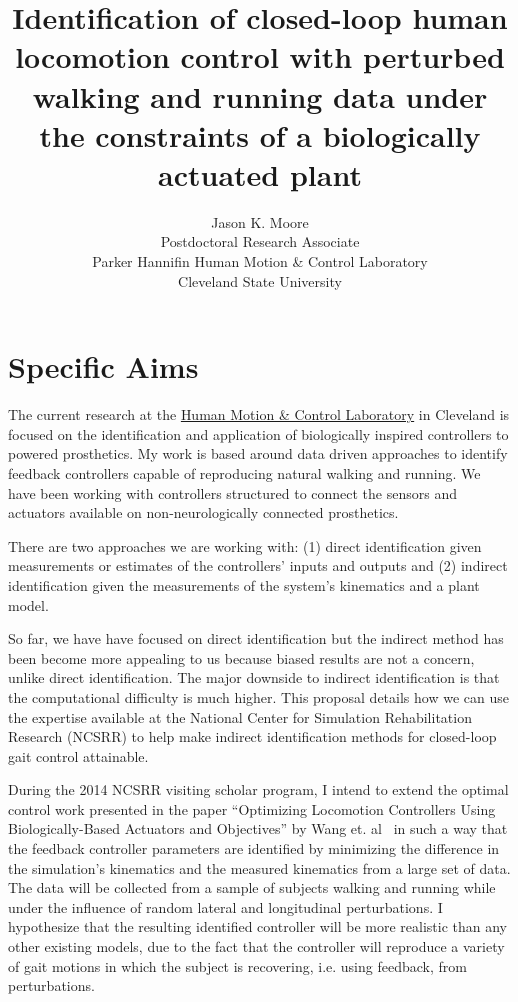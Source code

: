 \documentclass[11pt]{article}
\title{Identification of closed-loop human locomotion control with perturbed
walking and running data under the constraints of a biologically actuated
plant}
\author{Jason K. Moore\\
  Postdoctoral Research Associate\\
  Parker Hannifin Human Motion \& Control Laboratory\\
  Cleveland State University
}
\begin{document}
\maketitle

\section*{Specific Aims}

The current research at the \href{http://hmc.csuohio.edu}{Human Motion \&
Control Laboratory} in Cleveland is focused on the identification and
application of biologically inspired controllers to powered prosthetics. My
work is based around data driven approaches to identify feedback controllers
capable of reproducing natural walking and running. We have been working with
controllers structured to connect the sensors and actuators available on
non-neurologically connected prosthetics.

There are two approaches we are working with: (1) direct identification given
measurements or estimates of the controllers' inputs and outputs and (2)
indirect identification given the measurements of the system's kinematics and a
plant model.

So far, we have have focused on direct identification but the indirect method
has been become more appealing to us because biased results are not a concern,
unlike direct identification. The major downside to indirect identification is
that the computational difficulty is much higher. This proposal details how we
can use the expertise available at the National Center for Simulation
Rehabilitation Research (NCSRR) to help make indirect identification methods
for closed-loop gait control attainable.

During the 2014 NCSRR visiting scholar program, I intend to extend the optimal
control work presented in the paper ``Optimizing Locomotion Controllers Using
Biologically-Based Actuators and Objectives'' by Wang et. al~\cite{Wang2012} in
such a way that the feedback controller parameters are identified by minimizing the
difference in the simulation's kinematics and the measured kinematics from a
large set of data. The data will be collected from a sample of subjects walking
and running while under the influence of random lateral and longitudinal
perturbations. I hypothesize that the resulting identified controller will be
more realistic than any other existing models, due to the fact that the
controller will reproduce a variety of gait motions in which the subject is
recovering, i.e. using feedback, from perturbations.
\end{document}
